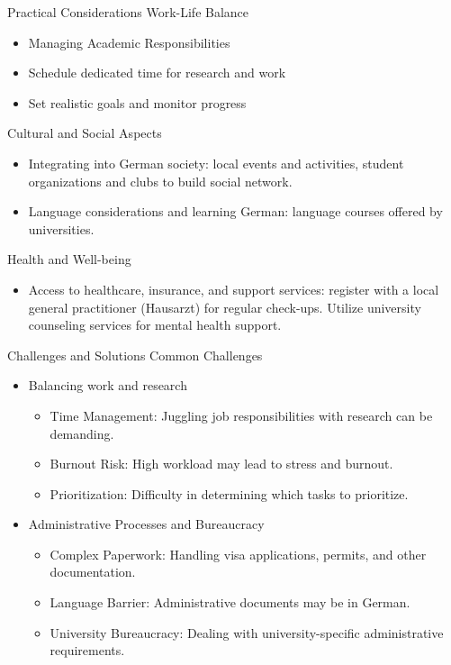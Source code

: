 \documentclass[10pt]{beamer}
\begin{document}
\begin{frame}[fragile]{Practical Considerations}
\alert{Work-Life Balance}
\begin{itemize}
	\item Managing Academic Responsibilities
	\item Schedule dedicated time for research and work
	\item Set realistic goals and monitor progress
\end{itemize}
\alert{Cultural and Social Aspects}
\begin{itemize}
	\item Integrating into German society: local events and activities, student organizations and clubs to build social network.
	\item Language considerations and learning German: language courses offered by universities.
\end{itemize}
\alert{Health and Well-being}
\begin{itemize}
	\item Access to healthcare, insurance, and support services: register with a local general practitioner (Hausarzt) for regular check-ups. Utilize university counseling services for mental health support.
\end{itemize}
\end{frame}


\begin{frame}[fragile]{Challenges and Solutions}
\alert{Common Challenges}
	\begin{itemize}
		\item Balancing work and research
		\begin{itemize}
			\item Time Management: Juggling job responsibilities with research can be demanding.
			\item Burnout Risk: High workload may lead to stress and burnout.
			\item Prioritization: Difficulty in determining which tasks to prioritize.
		\end{itemize}
		\item Administrative Processes and Bureaucracy
		\begin{itemize}
			\item Complex Paperwork: Handling visa applications, permits, and other documentation.
			\item Language Barrier: Administrative documents may be in German.
		\item University Bureaucracy: Dealing with university-specific administrative requirements.
		\end{itemize}
	\end{itemize}

\end{frame}
\end{document}
